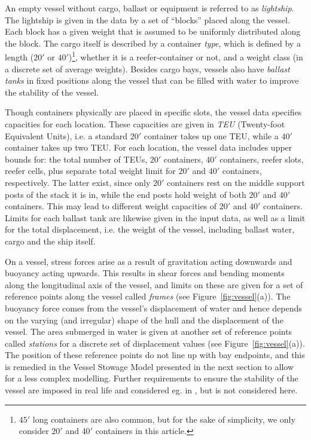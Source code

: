 An empty vessel without cargo, ballast or equipment is referred to as \emph{lightship}.  The lightship is given in the data by a set of ``blocks'' placed along the vessel. Each block has a given weight that is assumed to be uniformly distributed along the block.
%
The cargo itself is described by a container \emph{type}, which is defined by a length ($20'$ or $40'$)\footnote{$45'$ long containers are also common, but for the sake of simplicity, we only consider $20'$ and $40'$ containers in this article.}, whether it is a reefer-container or not, and a weight class (in a discrete set of average weights). 
Besides cargo bays, vessels also have \emph{ballast tanks} in fixed positions along the vessel that can be filled with water to improve the stability of the vessel.

Though containers physically are placed in specific slots, the vessel data specifies capacities for each location. These capacities are given in \emph{TEU} (Twenty-foot Equivalent Units), i.e. a standard $20'$ container takes up one TEU, while a $40'$ container takes up two TEU. For each location, the vessel data includes upper bounds for: the total number of TEUs, $20'$ containers, $40'$ containers, reefer slots, reefer cells, plus separate total weight limit for $20'$ and $40'$ containers, respectively. The latter exist, since only $20'$ containers rest on the middle support posts of the stack it is in, while the end posts hold weight of both $20'$ and $40'$ containers. This may lead to different weight capacities of $20'$ and $40'$ containers.
%
Limits for each ballast tank are likewise given in the input data, as well as a limit for the total displacement, i.e. the weight of the vessel, including ballast water, cargo and the ship itself. 

On a vessel, stress forces arise as a result of gravitation acting downwards and buoyancy acting upwards. This results in shear forces and bending moments along the longitudinal axis of the vessel, and limits on these are given for a set of reference points along the vessel called \emph{frames} (see Figure~\ref{fig:vessel}(a)). 
%
The buoyancy force comes from the vessel's displacement of water and hence depends on the varying (and irregular) shape of the hull and the displacement of the vessel. The area submerged in water is given at another set of reference points called \emph{stations} for a discrete set of displacement values (see Figure~\ref{fig:vessel}(a)).
The position of these reference points do not line up with bay endpoints, and this is remedied in the Vessel Stowage Model presented in the next section to allow for a less complex modelling.
%
Further requirements to ensure the stability of the vessel are imposed in real life and considered eg. in \cite{AlbertosThesis}, but is not considered here.
%
